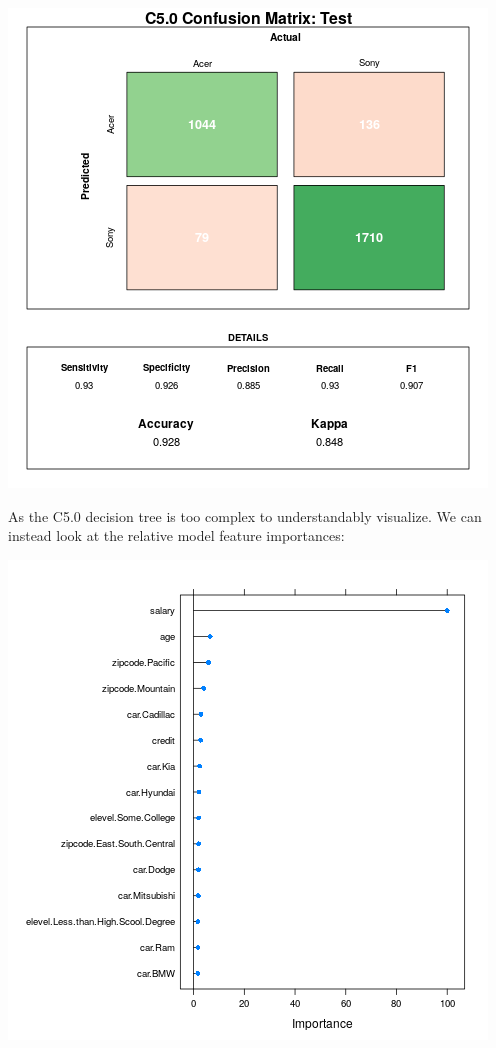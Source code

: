 \documentclass[12pt,a4paper,leqno]{report}
\theoremstyle{plain}
\theoremstyle{definition}
\theoremstyle{remark}
\begin{document}
\bigskip
{
    \centering
    \includegraphics[width=\textwidth,height=\textheight,keepaspectratio]{cm_c5.png}
    \par
}
\bigskip

As the C5.0 decision tree is too complex to understandably visualize. We can instead look at the
relative model feature importances:

\bigskip
{
    \centering
    \includegraphics[width=\textwidth,height=\textheight,keepaspectratio]{c5_full_feature_importance.png}
    \par
}
\bigskip
\end{document}
